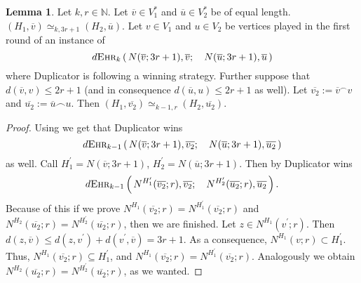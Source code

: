 \documentclass[12pt,notitlepage,a4paper]{article}
\theoremstyle{definition}
\newtheorem{lemma}{Lemma}[section]
\newcommand{\N}{\mathbb{N}}
\newcommand{\ehr}{\textsc{Ehr}}
\begin{document}
\begin{lemma} \label{lemm:Duplicator}
	Let $k,r\in \N$. Let $\overline{v}\in V_1^*$ and
	$\overline{u} \in V_2^*$ be of equal length.
	$(H_1,\overline{v})\simeq_{k,3r+1} (H_2,\overline{u})$.
	Let $v \in V_1$ and $u\in V_2$
	be vertices played in the first round of an instance of 
	\[
	d\ehr_k\left(\, N(\overline{v};3r+1),
	\overline{v}; \quad N(\overline{u};3r+1),\overline{u}\, \right)
	\]
	where Duplicator is following a winning strategy. Further suppose
	that $d(\overline{v},v)\leq 2r+1$ (and in consequence
	$d(\overline{u},u)\leq 2r+1$ as well). 
	Let $\overline{v_2}:=\overline{v}^\smallfrown v$
	and $\overline{u_2}:=\overline{u}\smallfrown u$.
	Then $(H_1,\overline{v_2})\simeq_{k-1,r}
	(H_2,\overline{u_2})$.
\end{lemma}

\begin{proof}
	Using  we get that Duplicator wins 
	\[
	d\ehr_{k-1}\left(\, N(\overline{v};3r+1),
	\overline{v_2}; \quad N(\overline{u};3r+1)
	,\overline{u_2} \, \right)\]
	as well. Call $H^\prime_1=N(\overline{v};3r+1)$,
	$H^\prime_2=N(\overline{u};3r+1)$. Then by 
	Duplicator wins
	\[
	d\ehr_{k-1}\left(\, N^{H^\prime_1}(
	\overline{v_2};r),\overline{v_2};\quad
	N^{H^\prime_2}(\overline{u_2};r),\overline{u_2}\, \right).
	\]
	Because of this if we prove $N^{H_1}(\overline{v_2};r)
	=N^{H^\prime_1}(\overline{v_2};r)$ and $N^{H_2}(\overline{u_2};r)
	=N^{H^\prime_2}(\overline{u_2};r)$, then we are finished. 
	Let $z\in N^{H_1}(v^\prime;r)$. Then
	$d(z,\overline{v})\leq d(z,v^\prime)+d(v^\prime,\overline{v})=3r+1$.
	As a consequence, $N^{H_1}(v;r)\subset H^\prime_1$. Thus,
	$N^{H_1}(\overline{v_2};r)\subseteq H^\prime_1$, and $N^{H_1}(\overline{v_2};r)
	=N^{H^\prime_1}(\overline{v_2};r)$. Analogously we obtain 
	$N^{H_2}(\overline{u_2};r)=N^{H^\prime_2}(\overline{u_2};r)$, as we wanted. 
\end{proof}
\end{document}
